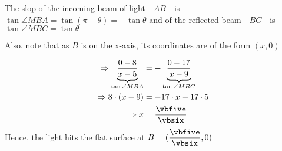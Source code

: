 \begin{solution}[\halfpage]
	The slop of the incoming beam of light - $AB$ - is $\tan\angle{MBA} = \tan (\pi-\theta) = -\tan\theta$ 
	and of the reflected beam - $BC$ - is $\tan\angle{MBC} = \tan\theta$
	
	Also, note that as $B$ is on the x-axis, its coordinates are of the form $(x,0)$
	
	\begin{align}
		\Rightarrow \underbrace{\dfrac{0-\vbtwo}{x-\vbone}}_{\tan\angle{MBA}} &= 
		-\underbrace{\dfrac{0-\vbfour}{x-\vbthree}}_{\tan\angle{MBC}} \\
		\Rightarrow \vbtwo\cdot(x-\vbthree) &= -\vbfour\cdot x + \vbfour\cdot\vbone \\
		\Rightarrow x &= \dfrac{\vbfive}{\vbsix}
	\end{align}
	Hence, the light hits the flat surface at $B = (\dfrac{\vbfive}{\vbsix}, 0)$
	
\end{solution}

